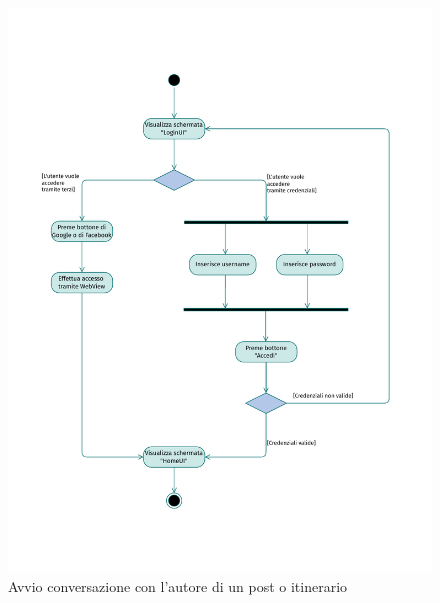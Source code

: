 \documentclass{natourDoc}
\begin{document}
\newpage
\begin{figure}[!htbp]
	\centering
	\includegraphics[width=\textwidth, page=15]{./diagrams/activity.pdf}
	\caption{Avvio conversazione con l'autore di un post o itinerario}
\end{figure}
\FloatBarrier
\end{document}
